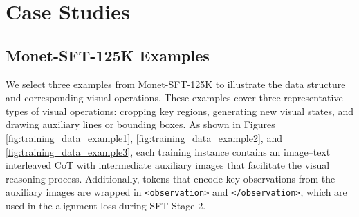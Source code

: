 \section{Case Studies}
\subsection{Monet-SFT-125K Examples}
We select three examples from Monet-SFT-125K to illustrate the data structure and corresponding visual operations. These examples cover three representative types of visual operations: cropping key regions, generating new visual states, and drawing auxiliary lines or bounding boxes. As shown in Figures \ref{fig:training_data_example1}, \ref{fig:training_data_example2}, and \ref{fig:training_data_example3}, each training instance contains an image–text interleaved CoT with intermediate auxiliary images that facilitate the visual reasoning process. Additionally, tokens that encode key observations from the auxiliary images are wrapped in \verb|<observation>| and \verb|</observation>|, which are used in the alignment loss during SFT Stage 2.




